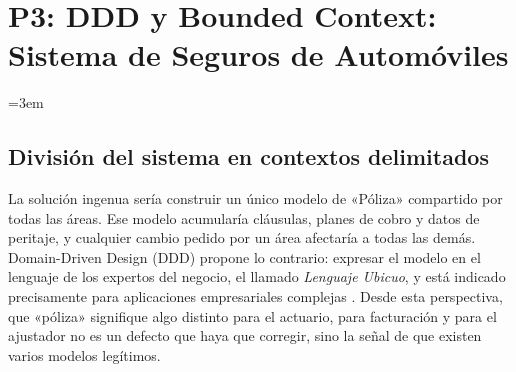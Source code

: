 
\usetikzlibrary{positioning,arrows.meta,calc}
\renewcommand{\lstlistingname}{Listado}

\chapter{P3: DDD y Bounded Context: Sistema de Seguros de Automóviles}
\label{sec:p3}
\begingroup\emergencystretch=3em
\section{División del sistema en contextos delimitados}
\label{sec:p3-division}

La solución ingenua sería construir un único modelo de «Póliza» compartido por
todas las áreas. Ese modelo acumularía cláusulas, planes de cobro y datos de peritaje, y
cualquier cambio pedido por un área afectaría a todas las demás. Domain-Driven Design
(DDD) propone lo contrario: expresar el modelo en el lenguaje de los expertos del
negocio, el llamado \emph{Lenguaje Ubicuo}, y está indicado precisamente para
aplicaciones empresariales complejas \parencite[21]{delatorre2010}. Desde esta
perspectiva, que «póliza» signifique algo distinto para el actuario, para facturación y
para el ajustador no es un defecto que
haya que corregir, sino la señal de que existen varios modelos legítimos.

